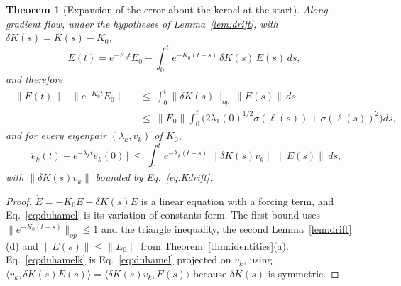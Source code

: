 \documentclass[11pt]{article}
\newtheorem{theorem}{Theorem}
\theoremstyle{definition}
\theoremstyle{remark}
\newcommand{\ip}[2]{\langle #1,#2\rangle}
\begin{document}
\begin{theorem}[Expansion of the error about the kernel at the start]\label{thm:duhamel}
Along gradient flow, under the hypotheses of Lemma~\ref{lem:drift}, with $\delta K(s) = K(s) - K_0$,
\begin{equation}\label{eq:duhamel}
E(t) = e^{-K_0t}E_0 - \int_0^te^{-K_0(t-s)}\,\delta K(s)\,E(s)\,ds ,
\end{equation}
and therefore
\begin{equation}\label{eq:duhamelbound}
\begin{aligned}
\Big|\,\|E(t)\| - \|e^{-K_0t}E_0\|\,\Big|\ &\le\ \int_0^t\|\delta K(s)\|_{op}\,\|E(s)\|\,ds\\
&\le\ \|E_0\|\int_0^t\Big(2\lambda_1(0)^{1/2}\sigma(\ell(s)) + \sigma(\ell(s))^2\Big)ds ,
\end{aligned}
\end{equation}
and for every eigenpair $(\lambda_k, v_k)$ of $K_0$,
\begin{equation}\label{eq:duhamelk}
\Big|\,\hat e_k(t) - e^{-\lambda_kt}\hat e_k(0)\,\Big|\ \le\ \int_0^te^{-\lambda_k(t-s)}\,\|\delta K(s)v_k\|\,\|E(s)\|\,ds ,
\end{equation}
with $\|\delta K(s)v_k\|$ bounded by Eq.~\eqref{eq:Kdrift}.
\end{theorem}

\begin{proof}
$\dot E = -K_0E - \delta K(s)E$ is a linear equation with a forcing term, and Eq.~\eqref{eq:duhamel} is its variation-of-constants form.
The first bound uses $\|e^{-K_0(t-s)}\|_{op}\le1$ and the triangle inequality, the second Lemma~\ref{lem:drift}(d) and $\|E(s)\|\le\|E_0\|$ from Theorem~\ref{thm:identities}(a).
Eq.~\eqref{eq:duhamelk} is Eq.~\eqref{eq:duhamel} projected on $v_k$, using $\ip{v_k}{\delta K(s)E(s)} = \ip{\delta K(s)v_k}{E(s)}$ because $\delta K(s)$ is symmetric.
\end{proof}
\end{document}
